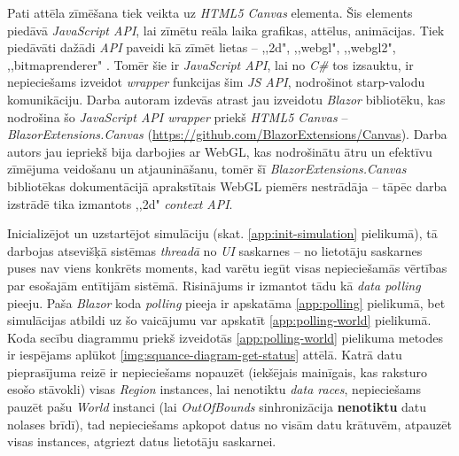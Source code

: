 Pati attēla zīmēšana tiek veikta uz \emph{HTML5 Canvas} elementa\cite{html5:canvas}.
Šis elements piedāvā \emph{JavaScript API}, lai zīmētu reāla laika grafikas, attēlus, animācijas.
Tiek piedāvāti dažādi \emph{API} paveidi kā zīmēt lietas -- ,,2d", ,,webgl", ,,webgl2",
,,bitmaprenderer" \cite{html5:canvas-contexts}. Tomēr šie ir \emph{JavaScript API}, lai
no \emph{C\#} tos izsauktu, ir nepieciešams izveidot \emph{wrapper} funkcijas šim \emph{JS API},
nodrošinot starp-valodu komunikāciju. Darba autoram izdevās atrast jau izveidotu \emph{Blazor} bibliotēku,
kas nodrošina šo \emph{JavaScript API wrapper} priekš  \emph{HTML5 Canvas} -- \emph{BlazorExtensions.Canvas}
(\url{https://github.com/BlazorExtensions/Canvas}).
Darba autors jau iepriekš bija darbojies ar WebGL, kas nodrošinātu ātru un efektīvu
zīmējuma veidošanu un atjaunināšanu, tomēr šī \emph{BlazorExtensions.Canvas} bibliotēkas
dokumentācijā aprakstītais WebGL piemērs nestrādāja -- tāpēc darba izstrādē tika
izmantots ,,2d" \emph{context API}.

Inicializējot un uzstartējot simulāciju (skat. \ref{app:init-simulation} pielikumā), tā darbojas atsevišķā
sistēmas \emph{threadā} no \emph{UI} saskarnes -- no lietotāju saskarnes puses nav
viens konkrēts moments, kad
varētu iegūt visas nepieciešamās vērtības par esošajām entītijām sistēmā. Risinājums
ir izmantot tādu kā \emph{data polling}\cite{progr:data-polling} pieeju. Paša \emph{Blazor} koda \emph{polling}
pieeja ir apskatāma \ref{app:polling} pielikumā, bet simulācijas atbildi uz šo
vaicājumu var apskatīt \ref{app:polling-world} pielikumā. Koda secību
diagrammu priekš izveidotās \ref{app:polling-world} pielikuma metodes ir iespējams
aplūkot \ref{img:squance-diagram-get-status}
attēlā. Katrā
datu pieprasījuma reizē ir nepieciešams nopauzēt (iekšējais mainīgais, kas raksturo esošo stāvokli) visas \emph{Region} instances,
lai nenotiktu \emph{data races}, nepieciešams pauzēt pašu \emph{World} instanci (lai
\emph{OutOfBounds} sinhronizācija \textbf{nenotiktu} datu nolases brīdī), tad nepieciešams apkopot
datus no visām datu krātuvēm, atpauzēt visas instances, atgriezt datus lietotāju saskarnei.

